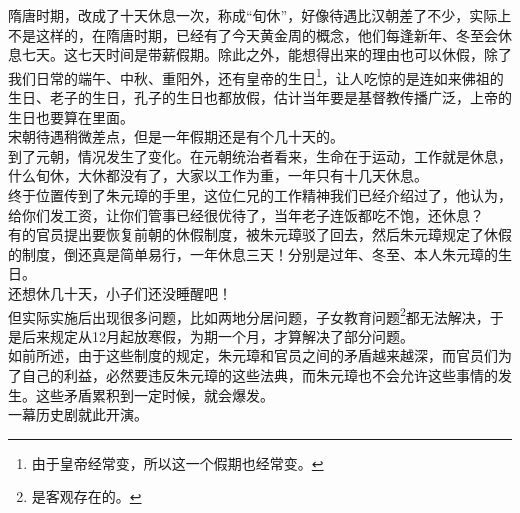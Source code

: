 \begin{multicols}{\theparacolNo}
隋唐时期，改成了十天休息一次，称成“旬休”，好像待遇比汉朝差了不少，实际上不是这样的，在隋唐时期，已经有了今天黄金周的概念，他们每逢新年、冬至会休息七天。这七天时间是带薪假期。除此之外，能想得出来的理由也可以休假，除了我们日常的端午、中秋、重阳外，还有皇帝的生日\footnote{由于皇帝经常变，所以这一个假期也经常变。}，让人吃惊的是连如来佛祖的生日、老子的生日，孔子的生日也都放假，估计当年要是基督教传播广泛，上帝的生日也要算在里面。\\

宋朝待遇稍微差点，但是一年假期还是有个几十天的。\\

到了元朝，情况发生了变化。在元朝统治者看来，生命在于运动，工作就是休息，什么旬休，大休都没有了，大家以工作为重，一年只有十几天休息。\\

终于位置传到了朱元璋的手里，这位仁兄的工作精神我们已经介绍过了，他认为，给你们发工资，让你们管事已经很优待了，当年老子连饭都吃不饱，还休息？\\

有的官员提出要恢复前朝的休假制度，被朱元璋驳了回去，然后朱元璋规定了休假的制度，倒还真是简单易行，一年休息三天！分别是过年、冬至、本人朱元璋的生日。\\

还想休几十天，小子们还没睡醒吧！\\

但实际实施后出现很多问题，比如两地分居问题，子女教育问题\footnote{是客观存在的。}都无法解决，于是后来规定从12月起放寒假，为期一个月，才算解决了部分问题。\\

如前所述，由于这些制度的规定，朱元璋和官员之间的矛盾越来越深，而官员们为了自己的利益，必然要违反朱元璋的这些法典，而朱元璋也不会允许这些事情的发生。这些矛盾累积到一定时候，就会爆发。\\

一幕历史剧就此开演。\\
\ifnum{}
	\end{multicols}
\fi
\newpage
